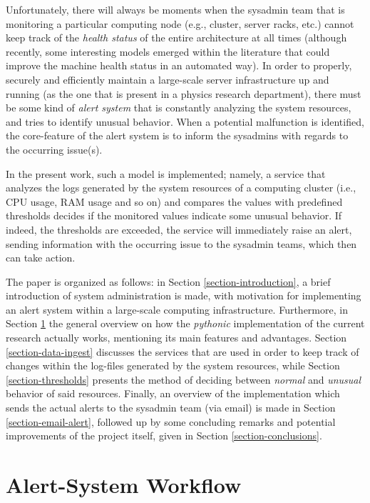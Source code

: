 \documentclass[conference]{IEEEtran}
\begin{document}
\par Unfortunately, there will always be moments when the sysadmin team that is monitoring a particular computing node (e.g., cluster, server racks, etc.) cannot keep track of the \emph{health status} of the entire architecture at all times (although recently, some interesting models emerged within the literature that could improve the machine health status \cite{hasani2019machine,lin2020health} in an automated way). In order to properly, securely and efficiently maintain a large-scale server infrastructure up and running (as the one that is present in a physics research department), there must be some kind of \emph{alert system} that is constantly analyzing the system resources, and tries to identify unusual behavior. When a potential malfunction is identified, the core-feature of the alert system is to inform the sysadmins with regards to the occurring issue(s).
\par In the present work, such a model is implemented; namely, a service that analyzes the logs generated by the system resources of a computing cluster (i.e., CPU usage, RAM usage and so on) and compares the values with predefined thresholds decides if the monitored values indicate some unusual behavior. If indeed, the thresholds are exceeded, the service will immediately raise an alert, sending information with the occurring issue to the sysadmin teams, which then can take action.
\par The paper is organized as follows: in Section \ref{section-introduction}, a brief introduction of system administration is made, with motivation for implementing an alert system within a large-scale computing infrastructure. Furthermore, in Section \ref{section-alert-workflow} the general overview on how the \emph{pythonic} implementation of the current research actually works, mentioning its main features and advantages. Section \ref{section-data-ingest} discusses the services that are used in order to keep track of changes within the log-files generated by the system resources, while Section \ref{section-thresholds} presents the method of deciding between \emph{normal} and \emph{unusual} behavior of said resources. Finally, an overview of the implementation which sends the actual alerts to the sysadmin team (via email) is made in Section \ref{section-email-alert}, followed up by some concluding remarks and potential improvements of the project itself, given in Section \ref{section-conclusions}.

\section{Alert-System Workflow}
\label{section-alert-workflow}
\end{document}
